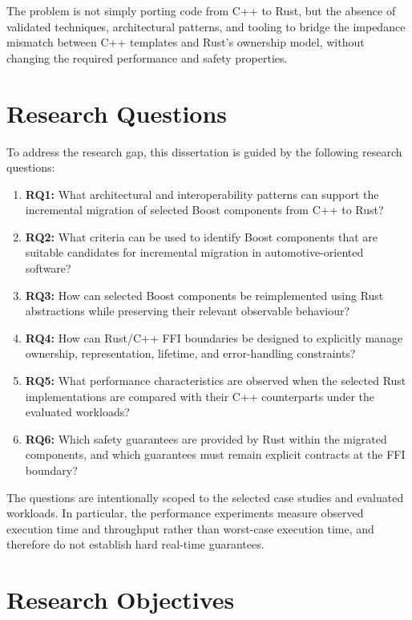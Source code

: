 The problem is not simply porting code from C++ to Rust, but the absence of validated techniques, architectural patterns, and tooling to bridge the impedance mismatch between C++ templates and Rust's ownership model, without changing the required performance and safety properties.


\section{Research Questions}
\label{sec:research_questions}

To address the research gap, this dissertation is guided by the following research questions:
\begin{enumerate}
    \item \textbf{RQ1:} What architectural and interoperability patterns can support the incremental migration of selected Boost components from C++ to Rust?
    \item \textbf{RQ2:} What criteria can be used to identify Boost components that are suitable candidates for incremental migration in automotive-oriented software?
    \item \textbf{RQ3:} How can selected Boost components be reimplemented using Rust abstractions while preserving their relevant observable behaviour?
    \item \textbf{RQ4:} How can Rust/C++ FFI boundaries be designed to explicitly manage ownership, representation, lifetime, and error-handling constraints?
    \item \textbf{RQ5:} What performance characteristics are observed when the selected Rust implementations are compared with their C++ counterparts under the evaluated workloads?
    \item \textbf{RQ6:} Which safety guarantees are provided by Rust within the migrated components, and which guarantees must remain explicit contracts at the FFI boundary?
\end{enumerate}

The questions are intentionally scoped to the selected case studies and evaluated workloads. In particular, the performance experiments measure observed execution time and throughput rather than worst-case execution time, and therefore do not establish hard real-time guarantees.

\section{Research Objectives}
\label{sec:research_objectives}

